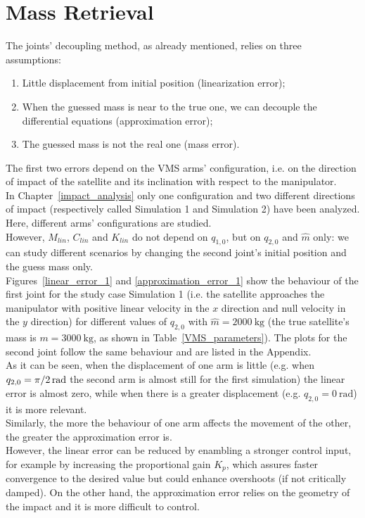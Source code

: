 \documentclass[a4paper,12pt,oneside]{report}
\begin{document}
\section{Mass Retrieval}
The joints' decoupling method, as already mentioned, relies on three assumptions:
\begin{enumerate}
  \item Little displacement from initial position (linearization error);
  \item When the guessed mass is near to the true one, we can decouple the differential equations (approximation error);
  \item The guessed mass is not the real one (mass error).
\end{enumerate}
The first two errors depend on the VMS arms' configuration, i.e. on the direction of impact of the satellite and its inclination with respect to the manipulator.\\
In Chapter~\ref{impact_analysis} only one configuration and two different directions of impact (respectively called Simulation 1 and Simulation 2) have been analyzed. Here, different arms' configurations are studied.\\
However, $M_{lin}$, $C_{lin}$ and $K_{lin}$ do not depend on $q_{1,0}$, but on $q_{2,0}$ and $\hat{m}$ only: we can study different scenarios by changing the second joint's initial position and the guess mass only.\\
Figures~\ref{linear_error_1} and \ref{approximation_error_1} show the behaviour of the first joint for the study case Simulation 1 (i.e. the satellite approaches the manipulator with positive linear velocity in the $x$ direction and null velocity in the $y$ direction) for different values of $q_{2,0}$ with $\hat{m}=\SI{2000}{\kilogram}$ (the true satellite's mass is $m=\SI{3000}{\kilogram}$, as shown in Table~\ref{VMS_parameters}). The plots for the second joint follow the same behaviour and are listed in the Appendix.\\
As it can be seen, when the displacement of one arm is little (e.g. when $q_{2,0}=\SI[parse-numbers = false]{\pi/2}{\radian}$ the second arm is almost still for the first simulation) the linear error is almost zero, while when there is a greater displacement (e.g. $q_{2,0}=\SI{0}{\radian}$) it is more relevant.\\
Similarly, the more the behaviour of one arm affects the movement of the other, the greater the approximation error is.\\
However, the linear error can be reduced by enambling a stronger control input, for example by increasing the proportional gain $K_p$, which assures faster convergence to the desired value but could enhance overshoots (if not critically damped). On the other hand, the approximation error relies on the geometry of the impact and it is more difficult to control.\\
\end{document}
